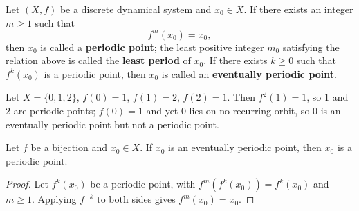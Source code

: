 \begin{definition}\label{def:periodic_point}
Let $(X,f)$ be a discrete dynamical system and $x_0\in X$. If there exists an integer $m\ge 1$ such that
\[
f^m(x_0)=x_0,
\]
then $x_0$ is called a \textbf{periodic point}; the least positive integer $m_0$ satisfying the relation above is called the \textbf{least period} of $x_0$. If there exists $k\ge 0$ such that $f^k(x_0)$ is a periodic point, then $x_0$ is called an \textbf{eventually periodic point}.
\end{definition}

\begin{example}\label{ex:eventually_periodic}
Let $X=\{0,1,2\}$, $f(0)=1$, $f(1)=2$, $f(2)=1$. Then $f^2(1)=1$, so $1$ and $2$ are periodic points; $f(0)=1$ and yet $0$ lies on no recurring orbit, so $0$ is an eventually periodic point but not a periodic point.
\end{example}

\begin{lemma}\label{lem:invertible_recurrence}
Let $f$ be a bijection and $x_0\in X$. If $x_0$ is an eventually periodic point, then $x_0$ is a periodic point.
\end{lemma}

\begin{proof}
Let $f^k(x_0)$ be a periodic point, with $f^m(f^k(x_0))=f^k(x_0)$ and $m\ge 1$. Applying $f^{-k}$ to both sides gives $f^m(x_0)=x_0$.
\end{proof}

